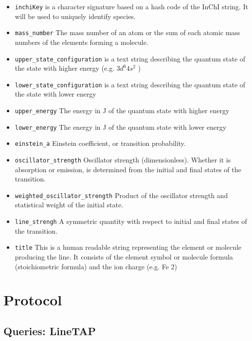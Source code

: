 \documentclass[11pt,a4paper]{ivoa}
\begin{document}
\begin{itemize}
\item \texttt{inchiKey} is a character signature based on a hash code of
the InChI string. It will be used to uniquely identify species.

\item \texttt{mass\_number} The mass number of an atom or the sum of
each atomic mass numbers of the elements forming a molecule.

\item \texttt{upper\_state\_configuration} is a text string describing the
quantum state of the state with higher energy (e.g. $3d^{6}4s^{2}$ )

\item \texttt{lower\_state\_configuration} is a text string describing the
quantum state of the state with lower energy

\item \texttt{upper\_energy} The energy  in J of the quantum state
with higher energy
\item \texttt{lower\_energy} The energy  in J of the quantum state
with lower energy

\item \texttt{einstein\_a} Einstein coefficient, or transition probability.

\item \texttt{oscillator\_strength} Oscillator strength (dimensionless). Whether it is absorption or emission, is determined from the initial and final states of the transition.

\item \texttt{weighted\_oscillator\_strength} Product of the oscillator strength and statistical weight of the initial state.

\item \texttt{line\_strengh} A symmetric quantity with respect to initial and final states of the transition.

\item \texttt{title} This is a human readable string representing the element or molecule producing the line. It consists 
of the element symbol or molecule formula (stoichiometric formula)   and the ion charge (e.g. Fe 2)

\end{itemize}


\section{Protocol}
\label{sec:Protocol}
\subsection{Queries: LineTAP}
\end{document}
